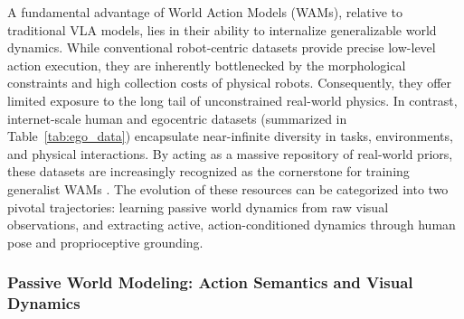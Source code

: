 A fundamental advantage of World Action Models (WAMs), relative to traditional VLA models, lies in their ability to internalize generalizable world dynamics. While conventional robot-centric datasets provide precise low-level action execution, they are inherently bottlenecked by the morphological constraints and high collection costs of physical robots. Consequently, they offer limited exposure to the long tail of unconstrained real-world physics. In contrast, internet-scale human and egocentric datasets (summarized in Table~\ref{tab:ego_data}) encapsulate near-infinite diversity in tasks, environments, and physical interactions. By acting as a massive repository of real-world priors, these datasets are increasingly recognized as the cornerstone for training generalist WAMs \cite{egoscale}. The evolution of these resources can be categorized into two pivotal trajectories: learning passive world dynamics from raw visual observations, and extracting active, action-conditioned dynamics through human pose and proprioceptive grounding.

\subsubsection{Passive World Modeling: Action Semantics and Visual Dynamics} 

